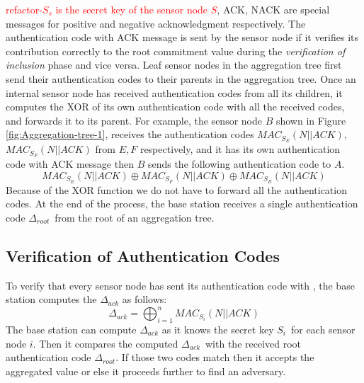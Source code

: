 		\textcolor{red}{refactor-$S_{s}$ is the secret key of the sensor node $S$},	ACK, NACK are special messages for positive and negative acknowledgment respectively.
		The authentication code with ACK message is sent by the sensor node if it verifies its contribution correctly to the root commitment value during the \textit{verification of inclusion} phase and vice versa.
		Leaf sensor nodes in the aggregation tree first send their authentication codes to their parents in the aggregation tree.
		Once an internal sensor node has received authentication codes from all its children, it computes the XOR of its own authentication code with all the received codes, and forwards it to its parent.
		For example, the sensor node $B$ shown in Figure \ref{fig:Aggregation-tree-1}, receives the authentication codes $MAC_{S_{E}}(N||ACK)$, $MAC_{S_{F}}(N||ACK)$ from $E,F$ respectively, and it has its own authentication code with ACK message then $B$ sends the following authentication code to $A$.
			\begin{equation}
				MAC_{S_{E}}(N||ACK) \oplus MAC_{S_{F}}(N||ACK) \oplus MAC_{S_{B}}(N||ACK)
			\end{equation}
		Because of the XOR function we do not have to forward all the authentication codes. 
		At the end of the process, the base station receives a single authentication code $\Delta_{root}$\ from the root of an aggregation tree.

	\subsection{Verification of Authentication Codes}
		\label{sec:verficiation-of-authentication-codes}
		
		To verify that every sensor node has sent its authentication code with \ack, the base station computes the $\Delta_{ack}$ as follows:
		\begin{equation}
			\label{eq:mac-auth}
			\displaystyle{\Delta_{ack} = \bigoplus_{i = 1}^n MAC_{S_{i}}(N || ACK) }
		\end{equation}
		The base station can compute $\Delta_{ack}$ as it knows the secret key $S_{i}$\ for each sensor node $i$.
		Then it compares the computed $\Delta_{ack}$\ with the received root authentication code $\Delta_{root}$. 
		If those two codes match then it accepts the aggregated value or else it proceeds further to find an adversary. 

